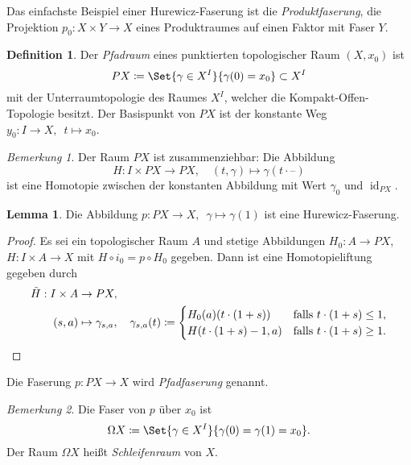 \documentclass[11pt, a4paper, german]{article}
\theoremstyle{definition}
\newtheorem{lem}{Lemma}
\newtheorem{defn}{Definition}
\theoremstyle{remark}
\newtheorem*{bem}{Bemerkung}
\DeclareMathOperator{\id}{id} %
\newcommand{\blank}{\text{--}} %
\newcommand{\I}{I} %
\begin{document}
Das einfachste Beispiel einer Hurewicz-Faserung ist die \emph{Produktfaserung}, die Projektion $p_0 : X \times Y \to X$ eines Produktraumes auf einen Faktor mit Faser $Y$.

\begin{defn}
  Der \emph{Pfadraum} eines punktierten topologischer Raum $(X, x_0)$ ist
  \[ PX \coloneqq \Set{\gamma \in X^\I}{\gamma(0) = x_0} \subset X^I \]
  mit der Unterraumtopologie des Raumes $X^I$, welcher die Kompakt-Offen-Topologie besitzt.
  Der Basispunkt von $PX$ ist der konstante Weg $y_0 : \I \to X, \enspace t \mapsto x_0$.
\end{defn}

\begin{bem}
  Der Raum $PX$ ist zusammenziehbar: Die Abbildung
  \[
    H : \I \times PX \to PX, \quad
    (t, \gamma) \mapsto \gamma(t \cdot \blank)
  \]
  ist eine Homotopie zwischen der konstanten Abbildung mit Wert $\gamma_0$ und $\id_{PX}$.
\end{bem}

\begin{lem}
  Die Abbildung
  $
    p : PX \to X, \enspace
    \gamma \mapsto \gamma(1)
  $
  ist eine Hurewicz-Faserung.
\end{lem}

\begin{proof}
  Es sei ein topologischer Raum $A$ und stetige Abbildungen $H_0 : A \to PX$, $H : \I \times A \to X$ mit $H \circ i_0 = p \circ H_0$ gegeben.
  Dann ist eine Homotopieliftung gegeben durch
  \begin{align*}
    \tilde{H} : \I \times A & \to PX, \\
    (s, a) & \mapsto \gamma_{s, a}, \quad
    \gamma_{s, a}(t) \coloneqq \begin{cases}
      H_0(a)(t \cdot (1+s)) & \text{falls $t \cdot (1+s) \leq 1$,} \\
      H(t \cdot (1+s) - 1, a) & \text{falls $t \cdot (1+s) \geq 1$.}
      \qedhere
    \end{cases}
  \end{align*}
\end{proof}

Die Faserung $p : PX \to X$ wird \emph{Pfadfaserung} genannt.

\begin{bem}
  Die Faser von $p$ über $x_0$ ist
  \[ \Omega X \coloneqq \Set{\gamma \in X^\I}{\gamma(0) = \gamma(1) = x_0}. \]
  Der Raum $\Omega X$ heißt \emph{Schleifenraum} von $X$.
\end{bem}
\end{document}
